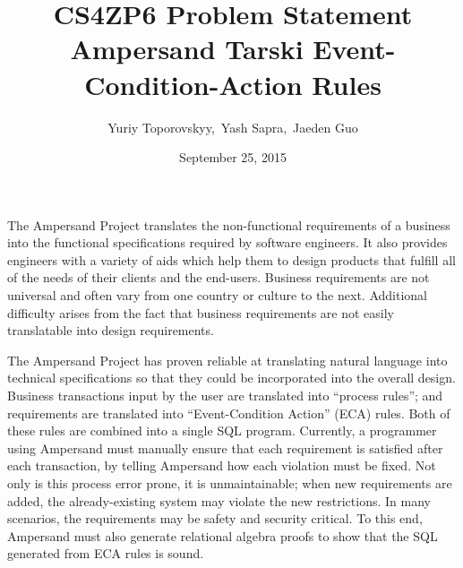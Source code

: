 \documentclass[12pt]{article}
\begin{document}
\title{CS4ZP6 Problem Statement \\ Ampersand Tarski Event-Condition-Action Rules } 
\author{Yuriy Toporovskyy,\ Yash Sapra,\ Jaeden Guo}
\date{September 25, 2015}
\thispagestyle{empty}
\maketitle

%
%
%

%

The Ampersand Project translates the non-functional requirements of a
business into the functional specifications required by software engineers. It
also provides engineers with a variety of aids which help them to design
products that fulfill all of the needs of their clients and the end-users.
%
%
Business requirements are not universal and often vary from one country or
culture to the next. Additional difficulty arises from the fact that business
requirements are not easily translatable into design requirements.

The Ampersand Project has proven reliable at translating natural
language into technical specifications so that they could be incorporated into
the overall design. Business transactions input by the user are translated into
``process rules''; and requirements are translated into ``Event-Condition
Action'' (ECA) rules. Both of these rules are combined into a single SQL
program. Currently, a programmer using Ampersand must manually ensure that each
requirement is satisfied after each transaction, by telling Ampersand how each
violation must be fixed. Not only is this process error prone, it is
unmaintainable; when new requirements are added, the already-existing system may
violate the new restrictions. In many scenarios, the requirements may be safety
and security critical. To this end, Ampersand must also generate relational
algebra proofs to show that the SQL generated from ECA rules is sound. 
\end{document}
